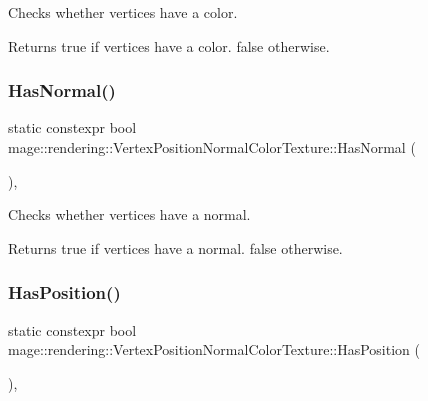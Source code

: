 Checks whether vertices have a color.

\begin{DoxyReturn}{Returns}
{\ttfamily true} if vertices have a color. {\ttfamily false} otherwise. 
\end{DoxyReturn}
\hypertarget{structmage_1_1rendering_1_1_vertex_position_normal_color_texture_aa8f1585c1dba229b765d5697a37cb0e6}{}\label{structmage_1_1rendering_1_1_vertex_position_normal_color_texture_aa8f1585c1dba229b765d5697a37cb0e6} 
\subsubsection{\texorpdfstring{Has\+Normal()}{HasNormal()}}
{\footnotesize\ttfamily static constexpr bool mage\+::rendering\+::\+Vertex\+Position\+Normal\+Color\+Texture\+::\+Has\+Normal (\begin{DoxyParamCaption}{ }\end{DoxyParamCaption})\hspace{0.3cm}{\ttfamily [static]}, {\ttfamily [noexcept]}}

Checks whether vertices have a normal.

\begin{DoxyReturn}{Returns}
{\ttfamily true} if vertices have a normal. {\ttfamily false} otherwise. 
\end{DoxyReturn}
\hypertarget{structmage_1_1rendering_1_1_vertex_position_normal_color_texture_a137dda2aa8e30d88c87b53cd4d2d2842}{}\label{structmage_1_1rendering_1_1_vertex_position_normal_color_texture_a137dda2aa8e30d88c87b53cd4d2d2842} 
\subsubsection{\texorpdfstring{Has\+Position()}{HasPosition()}}
{\footnotesize\ttfamily static constexpr bool mage\+::rendering\+::\+Vertex\+Position\+Normal\+Color\+Texture\+::\+Has\+Position (\begin{DoxyParamCaption}{ }\end{DoxyParamCaption})\hspace{0.3cm}{\ttfamily [static]}, {\ttfamily [noexcept]}}

